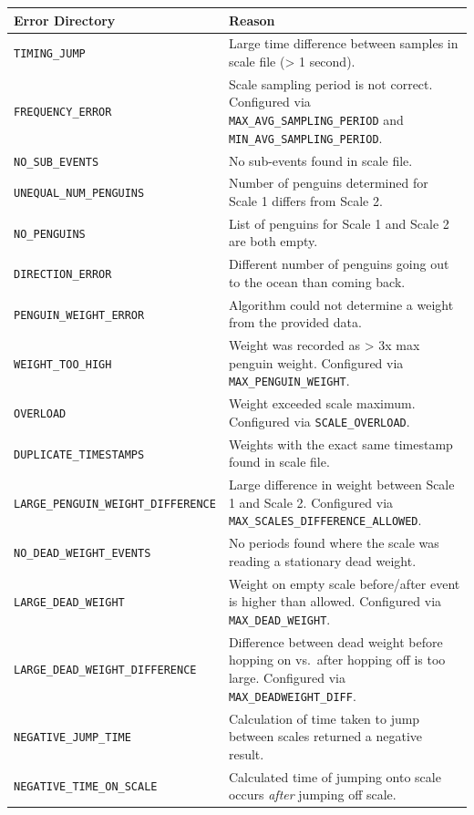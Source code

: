 \documentclass[
  letterpaper,
]{scrbook}
\begin{document}
\begin{longtable}[]{@{}
  >{\raggedright\arraybackslash}p{}
  >{\raggedright\arraybackslash}p{}@{}}
\toprule\noalign{}
\begin{minipage}[b]{\linewidth}\raggedright
Error Directory
\end{minipage} & \begin{minipage}[b]{\linewidth}\raggedright
Reason
\end{minipage} \\
\midrule\noalign{}
\endhead
\bottomrule\noalign{}
\endlastfoot
\texttt{TIMING\_JUMP} & Large time difference between samples in scale
file (\textgreater{} 1 second). \\
\texttt{FREQUENCY\_ERROR} & Scale sampling period is not correct.
Configured via \texttt{MAX\_AVG\_SAMPLING\_PERIOD} and
\texttt{MIN\_AVG\_SAMPLING\_PERIOD}. \\
\texttt{NO\_SUB\_EVENTS} & No sub-events found in scale file. \\
\texttt{UNEQUAL\_NUM\_PENGUINS} & Number of penguins determined for
Scale 1 differs from Scale 2. \\
\texttt{NO\_PENGUINS} & List of penguins for Scale 1 and Scale 2 are
both empty. \\
\texttt{DIRECTION\_ERROR} & Different number of penguins going out to
the ocean than coming back. \\
\texttt{PENGUIN\_WEIGHT\_ERROR} & Algorithm could not determine a weight
from the provided data. \\
\texttt{WEIGHT\_TOO\_HIGH} & Weight was recorded as \textgreater{} 3x
max penguin weight. Configured via \texttt{MAX\_PENGUIN\_WEIGHT}. \\
\texttt{OVERLOAD} & Weight exceeded scale maximum. Configured via
\texttt{SCALE\_OVERLOAD}. \\
\texttt{DUPLICATE\_TIMESTAMPS} & Weights with the exact same timestamp
found in scale file. \\
\texttt{LARGE\_PENGUIN\_WEIGHT\_DIFFERENCE} & Large difference in weight
between Scale 1 and Scale 2. Configured via
\texttt{MAX\_SCALES\_DIFFERENCE\_ALLOWED}. \\
\texttt{NO\_DEAD\_WEIGHT\_EVENTS} & No periods found where the scale was
reading a stationary dead weight. \\
\texttt{LARGE\_DEAD\_WEIGHT} & Weight on empty scale before/after event
is higher than allowed. Configured via \texttt{MAX\_DEAD\_WEIGHT}. \\
\texttt{LARGE\_DEAD\_WEIGHT\_DIFFERENCE} & Difference between dead
weight before hopping on vs.~after hopping off is too large. Configured
via \texttt{MAX\_DEADWEIGHT\_DIFF}. \\
\texttt{NEGATIVE\_JUMP\_TIME} & Calculation of time taken to jump
between scales returned a negative result. \\
\texttt{NEGATIVE\_TIME\_ON\_SCALE} & Calculated time of jumping onto
scale occurs \emph{after} jumping off scale. \\
\end{longtable}
\end{document}
